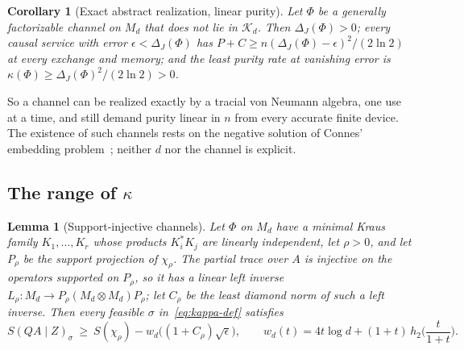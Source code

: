 \documentclass[11pt,a4paper]{article}
\theoremstyle{plain}
\newtheorem{corollary}[theorem]{Corollary}
\newtheorem{lemma}[theorem]{Lemma}
\theoremstyle{definition}
\theoremstyle{remark}
\begin{document}
\begin{corollary}[Exact abstract realization, linear purity]\label{cor:connes}
Let $\Phi$ be a generally factorizable channel on $M_d$ that does not lie in $\mathcal K_d$.
Then $\Delta_J(\Phi)>0$; every causal service with error $\epsilon<\Delta_J(\Phi)$ has $P+C\ge n(\Delta_J(\Phi)-\epsilon)^2/(2\ln2)$ at every
exchange and memory; and the least purity rate at vanishing error is $\kappa(\Phi)\ge\Delta_J(\Phi)^2/(2\ln2)>0$.
\end{corollary}

So a channel can be realized exactly by a tracial von Neumann algebra, one use at a time, and still demand purity linear in $n$ from every
accurate finite device. The existence of such channels rests on the negative solution of Connes' embedding problem~\cite{JNVWY2020}; neither
$d$ nor the channel is explicit.


\subsection{The range of $\kappa$}

\begin{lemma}[Support-injective channels]\label{lem:support-injective}
Let $\Phi$ on $M_d$ have a minimal Kraus family $K_1,\dots,K_r$ whose products $K_i^*K_j$ are linearly independent, let $\rho>0$, and let $P_\rho$ be the
support projection of $\chi_\rho$. The partial trace over $A$ is injective on the operators supported on $P_\rho$, so it has a linear left inverse
$L_\rho:M_d\to P_\rho(M_d\otimes M_d)P_\rho$; let $C_\rho$ be the least diamond norm of such a left inverse. Then every feasible $\sigma$
in~\eqref{eq:kappa-def} satisfies
\[
S(QA\mid Z)_\sigma\ \ge\ S(\chi_\rho)-w_d\big((1+C_\rho)\sqrt\epsilon\big),\qquad w_d(t)=4t\log d+(1+t)\,h_2\Big(\frac t{1+t}\Big).
\]
\end{lemma}
\end{document}
